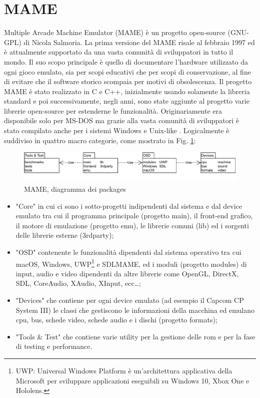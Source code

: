 \section{MAME}
Multiple Arcade Machine Emulator (MAME) è un progetto open-source (GNU-GPL) di Nicola Salmoria. La prima versione del MAME risale al febbraio 1997 ed è attualmente supportato da una vasta comunità di sviluppatori in tutto il mondo. Il suo scopo principale è quello di documentare l'hardware utilizzato da ogni gioco emulato, sia per scopi educativi che per scopi di conservazione, al fine di evitare che il software storico scompaia per motivi di obsolescenza. Il progetto MAME è stato realizzato in C e C++, inizialmente usando solamente la libreria standard e poi successivamente, negli anni, sono state aggiunte al progetto varie librerie open-source per estenderne le funzionalità. Originariamente era disponibile solo per MS-DOS ma grazie alla vasta comunità di sviluppatori è stato compilato anche per i sistemi Windows e Unix-like \parencite{MAME}. Logicalmente è suddiviso in quattro macro categorie, come mostrato in Fig. \ref{fig:mame_arch}:

\begin{figure}[H]
	\includegraphics[width=\linewidth]{immagini/mame_arch}
	\caption{MAME, diagramma dei packages}
	\label{fig:mame_arch}
\end{figure}

\begin{itemize}
	\item "Core" in cui ci sono i sotto-progetti indipendenti dal sistema e dal device emulato tra cui il programma principale (progetto main), il front-end grafico, il motore di emulazione (progetto emu), le librerie comuni (lib) ed i sorgenti delle librerie esterne (3rdparty);
	\item "OSD" contenente le funzionalità dipendenti dal sistema operativo tra cui macOS, Windows, UWP\footnote{UWP: Universal Windows Platform è un'architettura applicativa della Microsoft per sviluppare applicazioni eseguibili su Windows 10, Xbox One e Hololens.} e SDLMAME, ed i moduli (progetto modules) di input, audio e video dipendenti da altre librerie come OpenGL, DirectX, SDL, CoreAudio, XAudio, XInput, ecc\dots;
	\item "Devices" che contiene per ogni device emulato (ad esempio il Capcom CP System III) le classi che gestiscono le informazioni della macchina ed emulano cpu, bus, schede video, schede audio e i dischi (progetto formats);
	\item "Tools \& Test" che contiene varie utility per la gestione delle rom e per la fase di testing e performance.
\end{itemize}

